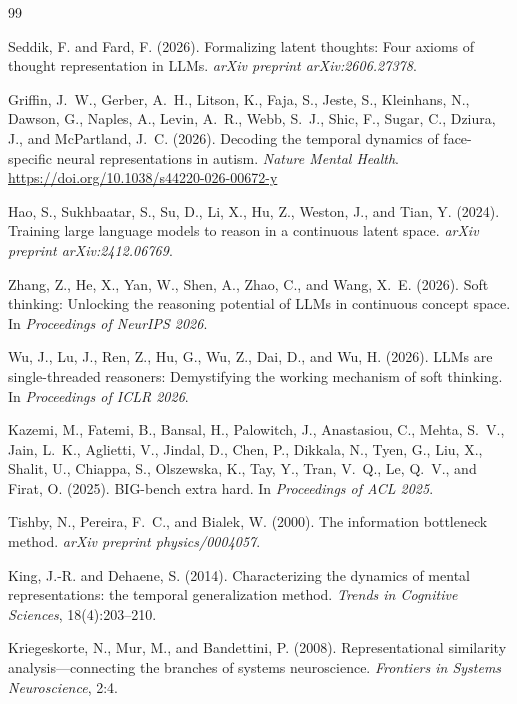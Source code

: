 \documentclass[11pt]{article}
\begin{document}
\newpage

\begin{thebibliography}{99}

Seddik, F. and Fard, F. (2026).
Formalizing latent thoughts: Four axioms of thought representation in LLMs.
\textit{arXiv preprint arXiv:2606.27378}.

Griffin, J.~W., Gerber, A.~H., Litson, K., Faja, S., Jeste, S., Kleinhans, N.,
Dawson, G., Naples, A., Levin, A.~R., Webb, S.~J., Shic, F., Sugar, C., Dziura, J.,
and McPartland, J.~C. (2026).
Decoding the temporal dynamics of face-specific neural representations in autism.
\textit{Nature Mental Health}.
\url{https://doi.org/10.1038/s44220-026-00672-y}

Hao, S., Sukhbaatar, S., Su, D., Li, X., Hu, Z., Weston, J., and Tian, Y. (2024).
Training large language models to reason in a continuous latent space.
\textit{arXiv preprint arXiv:2412.06769}.

Zhang, Z., He, X., Yan, W., Shen, A., Zhao, C., and Wang, X.~E. (2026).
Soft thinking: Unlocking the reasoning potential of LLMs in continuous concept space.
In \textit{Proceedings of NeurIPS 2026}.

Wu, J., Lu, J., Ren, Z., Hu, G., Wu, Z., Dai, D., and Wu, H. (2026).
LLMs are single-threaded reasoners: Demystifying the working mechanism of soft thinking.
In \textit{Proceedings of ICLR 2026}.

Kazemi, M., Fatemi, B., Bansal, H., Palowitch, J., Anastasiou, C., Mehta, S.~V.,
Jain, L.~K., Aglietti, V., Jindal, D., Chen, P., Dikkala, N., Tyen, G., Liu, X.,
Shalit, U., Chiappa, S., Olszewska, K., Tay, Y., Tran, V.~Q., Le, Q.~V., and Firat, O. (2025).
BIG-bench extra hard.
In \textit{Proceedings of ACL 2025}.

Tishby, N., Pereira, F.~C., and Bialek, W. (2000).
The information bottleneck method.
\textit{arXiv preprint physics/0004057}.

King, J.-R. and Dehaene, S. (2014).
Characterizing the dynamics of mental representations: the temporal generalization method.
\textit{Trends in Cognitive Sciences}, 18(4):203--210.

Kriegeskorte, N., Mur, M., and Bandettini, P. (2008).
Representational similarity analysis---connecting the branches of systems neuroscience.
\textit{Frontiers in Systems Neuroscience}, 2:4.


\end{thebibliography}
\end{document}
